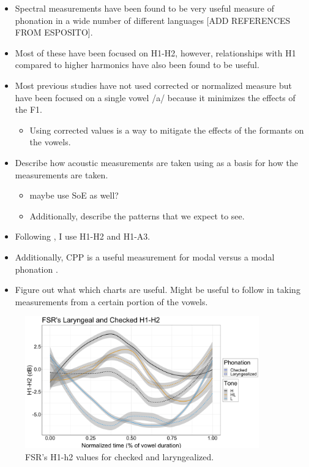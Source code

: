 \documentclass[12pt, letterpaper]{article}
\begin{document}
\begin{itemize}
	\item Spectral measurements have been found to be very useful measure of phonation in a wide number of different languages [ADD REFERENCES FROM ESPOSITO]. 
	\item Most of these have been focused on H1-H2, however, relationships with H1 compared to higher harmonics have also been found to be useful. 
	\item Most previous studies have not used corrected or normalized measure but have been focused on a single vowel /a/ because it minimizes the effects of the F1.
	\begin{itemize}
		\item Using corrected values is a way to mitigate the effects of the formants on the vowels. 
	\end{itemize}
	\item Describe how acoustic measurements are taken using \citet{garellekPhoneticsVoice2019} as a basis for how the measurements are taken. 
	\begin{itemize}
		\item maybe use SoE as well?
		\item Additionally, describe the patterns that we expect to see. 
	\end{itemize}
	\item Following \citet{espositoVariationContrastivePhonation2010}, I use H1-H2 and H1-A3. 
	\item Additionally, CPP is a useful measurement for modal versus a modal phonation \citep{garellekPhoneticsWhiteHmong2021}.
	\item Figure out what which charts are useful. Might be useful to follow \citet{espositoVariationContrastivePhonation2010} in taking measurements from a certain portion of the vowels. 
\end{itemize}

\begin{figure}[!ht]
	\includegraphics[width=0.9\textwidth]{../h1h2_CheckedLaryngeal.png}
	\caption{FSR's H1-h2 values for checked and laryngealized.}
	\label{fig:FSRh1h2checked} 
\end{figure}
\end{document}
